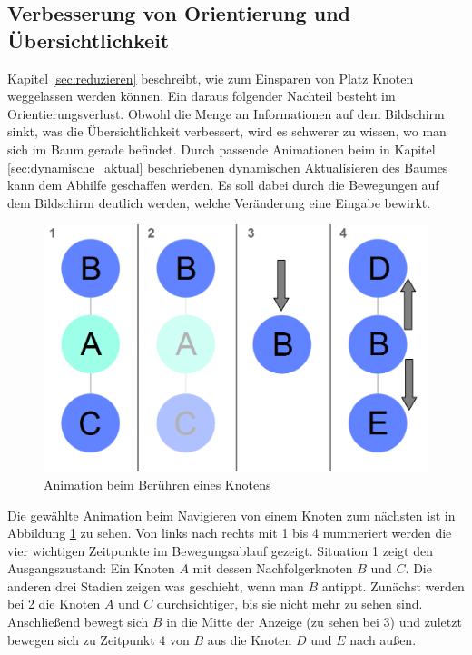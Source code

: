 \subsection{Verbesserung von Orientierung und Übersichtlichkeit}
Kapitel \ref{sec:reduzieren} beschreibt, wie zum Einsparen von Platz Knoten weggelassen werden können. Ein daraus folgender Nachteil besteht im Orientierungsverlust. Obwohl die Menge an Informationen auf dem Bildschirm sinkt, was die Übersichtlichkeit verbessert, wird es schwerer zu wissen, wo man sich im Baum gerade befindet. Durch passende Animationen beim in Kapitel \ref{sec:dynamische_aktual} beschriebenen dynamischen Aktualisieren des Baumes kann dem Abhilfe geschaffen werden. Es soll dabei durch die Bewegungen auf dem Bildschirm deutlich werden, welche Veränderung eine Eingabe bewirkt.
\begin{figure}
	\centering
	\includegraphics[width=.9\linewidth]{../screenshots/animation.png}
	\caption{Animation beim Berühren eines Knotens}
	\label{abb:animation}
\end{figure}
Die gewählte Animation beim Navigieren von einem Knoten zum nächsten ist in Abbildung \ref{abb:animation} zu sehen. Von links nach rechts mit 1 bis 4 nummeriert werden die vier wichtigen Zeitpunkte im Bewegungsablauf gezeigt. Situation 1 zeigt den Ausgangszustand: Ein Knoten $A$ mit dessen Nachfolgerknoten $B$ und $C$. Die anderen drei Stadien zeigen was geschieht, wenn man $B$ antippt. Zunächst werden bei 2 die Knoten $A$ und $C$ durchsichtiger, bis sie nicht mehr zu sehen sind. Anschließend bewegt sich $B$ in die Mitte der Anzeige (zu sehen bei 3) und zuletzt bewegen sich zu Zeitpunkt 4 von $B$ aus die Knoten $D$ und $E$ nach außen.

